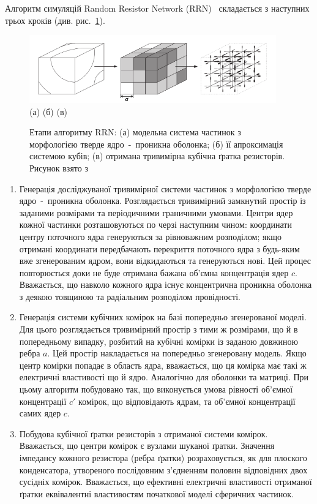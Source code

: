 \documentclass[14pt,twoside]{vakthesis}
\begin{document}
Алгоритм симуляцій Random Resistor Network (RRN)~\cite{Siekierski2005, 
	Siekierski2006, Siekierski2007} 
складається з наступних трьох кроків (див. рис.~\ref{fig:RRN}).

\begin{figure}[!hb]
	\centering
	\includegraphics[width=0.95\textwidth]{RRN.png}\\
	(а) \qquad\qquad\qquad\qquad\qquad (б) \qquad\qquad\qquad\qquad\qquad (в)
	\caption{\label{fig:RRN} Етапи алгоритму RRN: (а) модельна система частинок з морфологією тверде ядро~-~проникна оболонка; (б) її апроксимація системою кубів; (в) отримана тривимірна кубічна ґратка резисторів. Рисунок взято з~\cite{Siekierski2007}}
\end{figure}

\begin{enumerate}[label=\alph*)]
	\item Генерація досліджуваної тривимірної системи частинок з 
	морфологією тверде ядро~-~проникна оболонка. Розглядається 
	тривимірний замкнутий простір із заданими розмірами та 
	періодичними граничними умовами. Центри ядер кожної
	частинки розташовуються по черзі наступним чином:
	координати центру поточного ядра генеруються за рівноважним 
	розподілом; якщо отримані координати передбачають перекриття поточного ядра з 
	будь-яким вже згенерованим ядром, вони відкидаються та генеруються 
	нові. Цей процес повторюється доки не буде отримана 
	бажана об'ємна концентрація ядер $c$. Вважається, що
	навколо кожного ядра існує концентрична проникна оболонка з деякою 
	товщиною та радіальним розподілом провідності.
	
	\item Генерація системи кубічних комірок на базі попередньо 
	згенерованої моделі. Для цього розглядається тривимірний
	простір з тими ж розмірами, що й в попередньому випадку, 
	розбитий на кубічні комірки із заданою довжиною ребра $a$. 
	Цей простір накладається на попередньо згенеровану модель. 
	Якщо центр комірки попадає в область ядра, вважається, що 
	ця комірка має такі ж електричні властивості що й 
	ядро. Аналогічно для оболонки та матриці. При цьому алгоритм 
	побудовано так, що виконується умова рівності об'ємної 
	концентрації $c'$ комірок, що відповідають ядрам, та об'ємної концентрації самих ядер $c$.
	
	\item Побудова кубічної ґратки резисторів з отриманої системи
	комірок. Вважається, що центри комірок є вузлами 
	шуканої ґратки. Значення імпедансу кожного резистора (ребра ґратки) розраховується, як для плоского конденсатора, утвореного послідовним з'єдненням половин відповідних двох сусідніх комірок.
	Вважається, що ефективні електричні властивості отриманої 
	ґратки еквівалентні властивостям початкової моделі сферичних частинок.
\end{enumerate}
\end{document}
